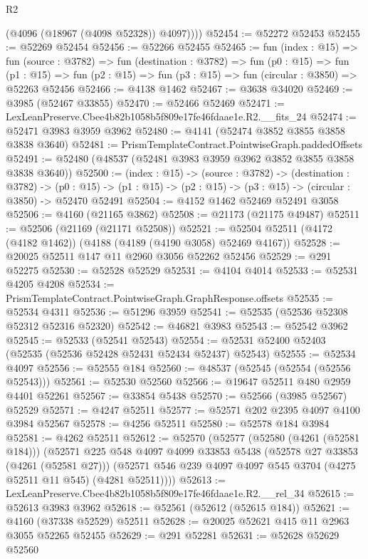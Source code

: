 \begin{lexlean}{R2}
\begin{coremodule}
          (@4096 (@18967 (@4098 @52328)) @4097))))
@52454 := @52272 @52453
@52455 := @52269 @52454
@52456 := @52266 @52455
@52465 := fun (index : @15) =>
  fun (source : @3782) =>
  fun (destination : @3782) =>
  fun (p0 : @15) =>
  fun (p1 : @15) => fun (p2 : @15) => fun (p3 : @15) => fun (circular : @3850) => @52263 @52456
@52466 := @4138 @1462
@52467 := @3638 @34020
@52469 := @3985 (@52467 @33855)
@52470 := @52466 @52469
@52471 := LexLeanPreserve.Cbee4b82b1058b5f809e17fe46fdaae1e.R2.__fits_24
@52474 := @52471 @3983 @3959 @3962
@52480 := @4141 (@52474 @3852 @3855 @3858 @3838 @3640)
@52481 := PrismTemplateContract.PointwiseGraph.paddedOffsets
@52491 := @52480 (@48537 (@52481 @3983 @3959 @3962 @3852 @3855 @3858 @3838 @3640))
@52500 := (index : @15) ->
  (source : @3782) ->
  (destination : @3782) ->
  (p0 : @15) -> (p1 : @15) -> (p2 : @15) -> (p3 : @15) -> (circular : @3850) -> @52470 @52491
@52504 := @4152 @1462 @52469 @52491 @3058
@52506 := @4160 (@21165 @3862)
@52508 := @21173 (@21175 @49487)
@52511 := @52506 (@21169 (@21171 @52508))
@52521 := @52504 @52511 (@4172 (@4182 @1462)) (@4188 (@4189 (@4190 @3058) @52469 @4167))
@52528 := @20025 @52511 @147 @11 @2960 @3056 @52262 @52456
@52529 := @291 @52275
@52530 := @52528 @52529
@52531 := @4104 @4014
@52533 := @52531 @4205 @4208
@52534 := PrismTemplateContract.PointwiseGraph.GraphResponse.offsets
@52535 := @52534 @4311
@52536 := @51296 @3959
@52541 := @52535 (@52536 @52308 @52312 @52316 @52320)
@52542 := @46821 @3983
@52543 := @52542 @3962
@52545 := @52533 (@52541 @52543)
@52554 := @52531 @52400 @52403 (@52535 (@52536 @52428 @52431 @52434 @52437) @52543)
@52555 := @52534 @4097
@52556 := @52555 @184
@52560 := @48537 (@52545 (@52554 (@52556 @52543)))
@52561 := @52530 @52560
@52566 := @19647 @52511 @480 @2959 @4401 @52261
@52567 := @33854 @5438
@52570 := @52566 (@3985 @52567) @52529
@52571 := @4247 @52511
@52577 := @52571 @202 @2395 @4097 @4100 @3984 @52567
@52578 := @4256 @52511
@52580 := @52578 @184 @3984
@52581 := @4262 @52511
@52612 := @52570
    (@52577
      (@52580 (@4261 (@52581 @184)))
      (@52571
        @225
        @548
        @4097
        @4099
        @33853
        @5438
        (@52578 @27 @33853 (@4261 (@52581 @27)))
        (@52571 @546 @239 @4097 @4097 @545 @3704 (@4275 @52511 @11 @545) (@4281 @52511))))
@52613 := LexLeanPreserve.Cbee4b82b1058b5f809e17fe46fdaae1e.R2.__rel_34
@52615 := @52613 @3983 @3962
@52618 := @52561 (@52612 (@52615 @184))
@52621 := @4160 (@37338 @52529) @52511
@52628 := @20025 @52621 @415 @11 @2963 @3055 @52265 @52455
@52629 := @291 @52281
@52631 := @52628 @52629 @52560

\end{coremodule}
\end{lexlean}
